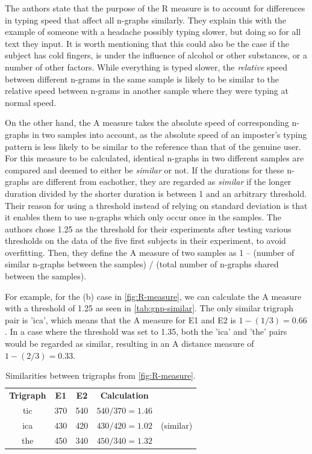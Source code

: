 \documentclass[informationsecurity]{gucmasterproject}
\begin{document}
The authors state that the purpose of the R measure is to account for differences in typing speed that affect all n-graphs similarly.
They explain this with the example of someone with a headache possibly typing slower, but doing so for all text they input.
It is worth mentioning that this could also be the case if the subject has cold fingers, is under the influence of alcohol or other substances, or a number of other factors.
While everything is typed slower, the \textit{relative} speed between different n-grams in the same sample is likely to be similar to the relative speed between n-grams in another sample where they were typing at normal speed.

On the other hand, the A measure takes the absolute speed of corresponding n-graphs in two samples into account, as the absolute speed of an imposter's typing pattern is less likely to be similar to the reference than that of the genuine user.
For this measure to be calculated, identical n-graphs in two different samples are compared and deemed to either be \textit{similar} or not.
If the durations for these n-graphs are different from eachother, they are regarded as \textit{similar} if the longer duration divided by the shorter duration is between 1 and an arbitrary threshold.
Their reason for using a threshold instead of relying on standard deviation is that it enables them to use n-graphs which only occur once in the samples.
The authors chose 1.25 as the threshold for their experiments after testing various thresholds on the data of the five first subjects in their experiment, to avoid overfitting.
Then, they define the A measure of two samples as 1 -- (number of similar n-graphs between the samples) / (total number of n-graphs shared between the samples).

For example, for the (b) case in \autoref{fig:R-measure}, we can calculate the A measure with a threshold of 1.25 as seen in \autoref{tab:gnp-similar}.
The only similar trigraph pair is 'ica', which means that the A measure for E1 and E2 is $1-(1/3)=0.66$.
In a case where the threshold was set to 1.35, both the 'ica' and 'the' pairs would be regarded as similar, resulting in an A distance measure of $1-(2/3)=0.33$.
\begin{table}[h]
\centering
\begin{tabular}{ccccc}
 \bf Trigraph & \bf E1 & \bf E2 & \bf Calculation &  \\
 tic & 370 & 540 & $540/370=1.46$ &  \\
 ica & 430 & 420 & $430/420=1.02$ & (similar) \\
 the & 450 & 340 & $450/340=1.32$ & 
\end{tabular}
\caption{Similarities between trigraphs from \autoref{fig:R-measure}.}
\label{tab:gnp-similar}
\end{table}
\end{document}
